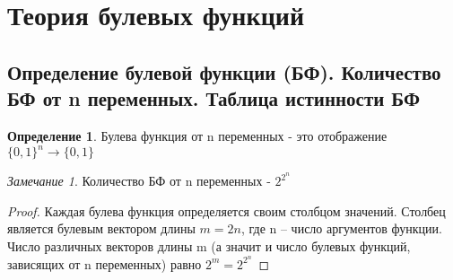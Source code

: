 \documentclass[a4paper]{article}
\theoremstyle{definition}
\newtheorem*{definition}{Определение}
\theoremstyle{remark}
\newtheorem*{remark}{Замечание}
\begin{document}
    \tableofcontents
    \setcounter{page}{1}
    \section{Теория булевых функций}
    \subsection{Определение булевой функции (БФ). Количество БФ от n переменных. Таблица истинности БФ}
    \begin{definition}
        Булева функция от n переменных - это отображение $\{0,1\}^n \rightarrow \{0, 1\}$
    \end{definition}

    \begin{remark}
        Количество БФ от n переменных - $2^{2^n}$
    \end{remark}
    \begin{proof}
        Каждая булева функция определяется своим столбцом значений.
         Столбец является булевым вектором длины $m=2n$, где n – число аргументов функции.
          Число различных векторов длины m (а значит и число булевых функций, зависящих от n переменных) равно $2^m=2^{2^n}$
    \end{proof}
\end{document}
